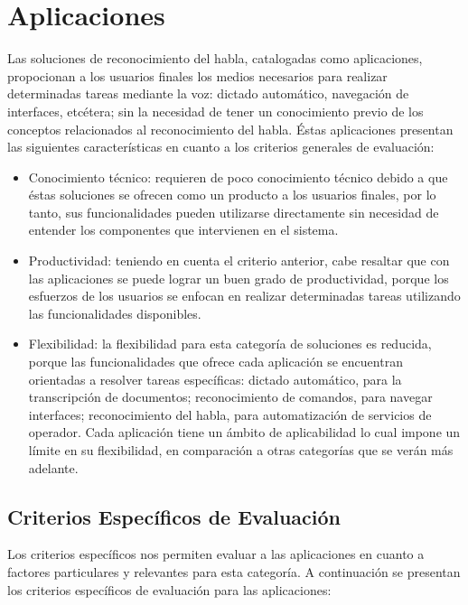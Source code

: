 \section{Aplicaciones}
\label{sec:aplicaciones}


Las soluciones de reconocimiento del habla, catalogadas como aplicaciones, propocionan
a los usuarios finales los medios necesarios para realizar determinadas tareas mediante
la voz: dictado autom\'atico, navegaci\'on de interfaces, etc\'etera; sin
la necesidad de tener un conocimiento previo de los conceptos relacionados al
reconocimiento del habla. \'Estas aplicaciones presentan las siguientes 
caracter\'isticas en cuanto a los criterios generales de evaluaci\'on:

\begin{itemize}
    \item Conocimiento t\'ecnico: requieren de poco conocimiento t\'ecnico debido a que \'estas
        soluciones se ofrecen como un producto a los usuarios finales, por lo tanto, sus funcionalidades
        pueden utilizarse directamente sin necesidad de entender los componentes que intervienen
         en el sistema.
    \item Productividad: teniendo en cuenta el criterio anterior, cabe resaltar que con
        las aplicaciones se puede lograr un buen grado de productividad, porque los esfuerzos
        de los usuarios se enfocan en realizar determinadas tareas utilizando las funcionalidades
         disponibles.
    \item Flexibilidad: la flexibilidad para esta categor\'ia de soluciones es reducida, porque las
        funcionalidades que ofrece cada aplicaci\'on se encuentran orientadas a resolver tareas
        espec\'ificas: dictado autom\'atico, para la transcripci\'on de documentos; reconocimiento
        de comandos, para navegar interfaces; reconocimiento del habla, para 
        automatizaci\'on de servicios de operador. Cada aplicaci\'on tiene un \'ambito de aplicabilidad
        lo cual impone un l\'imite en su flexibilidad, en comparaci\'on a otras categor\'ias que
         se ver\'an m\'as adelante.
\end{itemize}

\subsection{Criterios Espec\'ificos de Evaluaci\'on}

Los criterios espec\'ificos nos permiten evaluar a las aplicaciones en cuanto a factores
particulares y relevantes para esta categor\'ia. A continuaci\'on se presentan los criterios 
espec\'ificos de evaluaci\'on para las aplicaciones:


